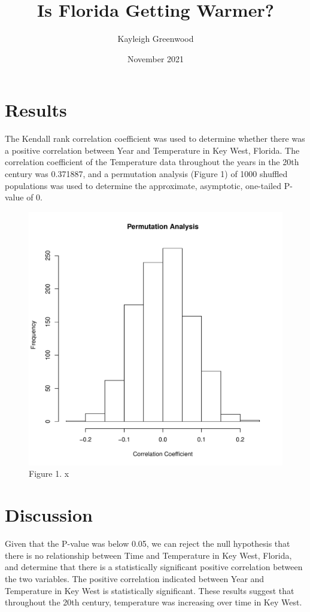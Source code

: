 \documentclass{article}
\title{Is Florida Getting Warmer?}
\author{Kayleigh Greenwood}
\date{November 2021}
\begin{document}
\maketitle

\section{Results}
The Kendall rank correlation coefficient was used to determine whether there was a positive correlation between Year and Temperature in Key West, Florida. The correlation coefficient of the Temperature data throughout the years in the 20th century was 0.371887, and a permutation analysis (Figure 1) of 1000 shuffled populations was used to determine the approximate, asymptotic, one-tailed P-value of 0.

\begin{figure}[H]
\centering
\includegraphics[scale=0.75]{../results/allcoeffshist.pdf}
\caption{Figure 1. x}
\end{figure}

\section{Discussion}
 Given that the P-value was below 0.05, we can reject the null hypothesis that there is no relationship between Time and Temperature in Key West, Florida, and determine that there is a statistically significant positive correlation between the two variables. The positive correlation indicated between Year and Temperature in Key West is statistically significant.
These results suggest that throughout the 20th century, temperature was increasing over time in Key West.
\end{document}
